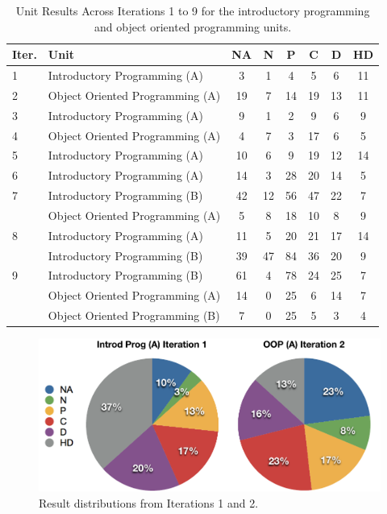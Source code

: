 \begin{table}[p]
  \footnotesize
  \renewcommand{\arraystretch}{1.3}
  \caption{Unit Results Across Iterations 1 to 9 for the introductory programming and object oriented programming units.}
  \label{tbl:unit_results}
  \centering
    \begin{tabular}{l|l|c|c|c|c|c|c}
        Iter. & Unit    & NA & N  & P  & C  & D  & HD \\ \hline
        1         & Introductory Programming (A)  & 3  & 1  & 4  & 5  & 6  & 11 \\ \hline
        2         & Object Oriented Programming (A) & 19 & 7  & 14 & 19 & 13 & 11 \\ \hline
        3         & Introductory Programming (A)  & 9  & 1  & 2  & 9  & 6  & 9  \\ \hline
        4         & Object Oriented Programming (A) & 4  & 7  & 3  & 17 & 6  & 5  \\ \hline
        5         & Introductory Programming (A)  & 10 & 6  & 9  & 19 & 12 & 14 \\ \hline
        6         & Introductory Programming (A)  & 14 & 3  & 28 & 20 & 14 & 5  \\ \hline
        7         & Introductory Programming (B)  & 42 & 12 & 56 & 47 & 22 & 7  \\ 
        ~         & Object Oriented Programming (A) & 5  & 8  & 18 & 10 & 8  & 9  \\ \hline
        8         & Introductory Programming (A)  & 11 & 5  & 20 & 21 & 17 & 14 \\ 
        ~         & Introductory Programming (B)  & 39 & 47 & 84 & 36 & 20 & 9  \\ \hline
        9         & Introductory Programming (B)  & 61 & 4  & 78 & 24 & 25 & 7  \\ 
        ~         & Object Oriented Programming (A) & 14 & 0  & 25 & 6  & 14 & 7  \\ 
        ~         & Object Oriented Programming (B) & 7  & 0  & 25 & 5  & 3  & 4  
    \end{tabular}
\end{table}

\begin{figure}[p]
  \centering
  \includegraphics[width=0.8\columnwidth]{Iterations1_2}
  \caption{Result distributions from Iterations 1 and 2.}
  \label{fig:iterations_1_2}
\end{figure}

